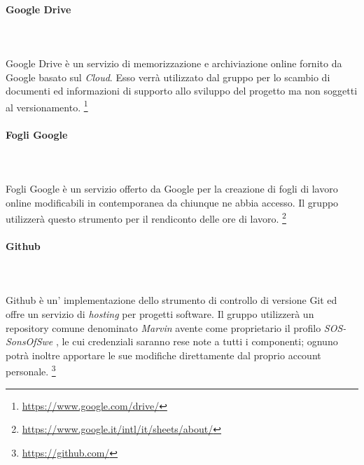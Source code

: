 \paragraph{Google Drive}
	~\\~\\Google Drive è un servizio di memorizzazione e archiviazione online fornito da Google basato sul \emph{Cloud}. Esso verrà utilizzato dal gruppo per lo scambio di documenti ed informazioni di supporto allo sviluppo del progetto ma non soggetti al versionamento.
	\footnote{\href{https://www.google.com/drive/}{https://www.google.com/drive/}}
	

\paragraph{Fogli Google}
	~\\~\\Fogli Google è un servizio offerto da Google per la creazione di fogli di lavoro online modificabili in contemporanea da chiunque ne abbia accesso. Il gruppo utilizzerà questo strumento per il rendiconto delle ore di lavoro.
	\footnote{\href{https://www.google.it/intl/it/sheets/about/}{https://www.google.it/intl/it/sheets/about/}}
	
\paragraph{Github}
	~\\~\\Github è un' implementazione dello strumento di controllo di versione Git ed offre un servizio di \emph{hosting} per progetti software. Il gruppo utilizzerà un repository comune denominato \textit{Marvin} avente come proprietario il profilo \textit{SOS-SonsOfSwe} , le cui credenziali saranno rese note a tutti i componenti; ognuno potrà inoltre apportare le sue modifiche direttamente dal proprio account personale.
	\footnote{\href{https://github.com/}{https://github.com/}}
	
